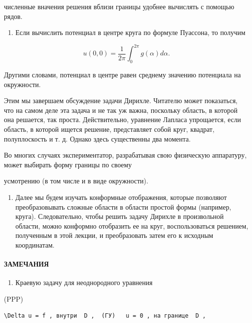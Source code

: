 \documentclass[
  ukrainian,
]{article}
\providecommand{\tightlist}{%
  \setlength{\itemsep}{0pt}\setlength{\parskip}{0pt}}
\begin{document}
численные вначения решения вблизи границы удобнее вычислять с помощью
рядов.

\begin{enumerate}
\def\labelenumi{\arabic{enumi}.}
\setcounter{enumi}{1}
\tightlist
\item
  Если вычислить потенциал в центре круга по формуле Пуассона, то
  получим
\end{enumerate}

\[
u(0, 0) = \frac{1}{2\pi} \int_{0}^{2\pi} g(\alpha) d\alpha.
\]

Другими словами, потенциал в центре равен среднему значению потенциала
на окружности.

Этим мы завершаем обсуждение задачи Дирихле. Читателю может показаться,
что на самом деле эта задача и не так уж важна, поскольку область, в
которой она решается, так проста. Действительно, уравнение Лапласа
упрощается, если область, в которой ищется решение, представляет собой
круг, квадрат, полуплоскость и т. д. Однако здесь существенны два
момента.

Во многих случаях экспериментатор, разрабатывая свою физическую
аппаратуру, может выбирать форму границы по своему

усмотрению (в том числе и в виде окружности).

\begin{enumerate}
\def\labelenumi{\arabic{enumi}.}
\setcounter{enumi}{1}
\tightlist
\item
  Далее мы будем изучать конформные отображения, которые позволяют
  преобразовывать сложные области в области простой формы (например,
  круга). Следовательно, чтобы решить задачу Дирихле в произвольной
  области, можно конформно отобразить ее на круг, воспользоваться
  решением, полученным в этой лекции, и преобразовать затем его к
  исходным координатам.
\end{enumerate}

\paragraph{ЗАМЕЧАНИЯ}\label{ux437ux430ux43cux435ux447ux430ux43dux438ux44f-8}

\begin{enumerate}
\def\labelenumi{\arabic{enumi}.}
\tightlist
\item
  Краевую задачу для неоднородного уравнения
\end{enumerate}

(PPP)

\begin{verbatim}
\Delta u = f , внутри  D ,  (ГУ)   u = 0 , на границе  D ,
\end{verbatim}
\end{document}
